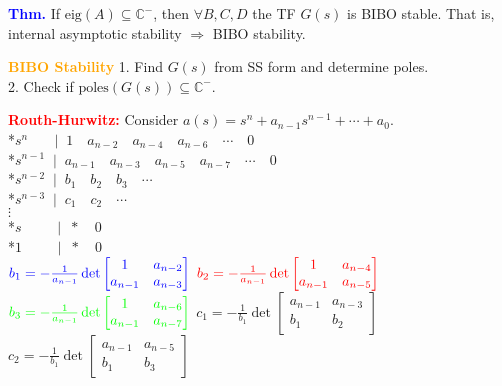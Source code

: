 \documentclass[5pt]{extarticle} %
\begin{document}
\begin{paracol}{3}
{    \textcolor{blue}{\textbf{Thm.}} If $\text{eig}(A) \subseteq \mathbb{C}^{-}$, then $\forall B, C, D$ the TF $G(s)$ is BIBO stable. That is, internal asymptotic stability $\Rightarrow$ BIBO stability.

    \textcolor{orange}{\textbf{BIBO Stability}} 1. Find $G(s)$ from SS form and determine poles. \\
    2. Check if $\text{poles}(G(s)) \subseteq \mathbb{C}^{-}$.
    
    \textcolor{red}{\textbf{Routh-Hurwitz:}} Consider $a(s) = s^n + a_{n-1} s^{n-1} + \cdots + a_0$. \\
    *$s^n \quad \; \, \, \mid \; 1 \quad a_{n-2} \quad a_{n-4} \quad a_{n-6} \quad \cdots \quad 0$ \\ 
    *$s^{n-1} \; \mid \; a_{n-1} \quad a_{n-3} \quad a_{n-5} \quad a_{n-7} \quad \cdots \quad 0$ \\
    *$s^{n-2} \; \mid \; b_1 \quad b_2 \quad b_3 \quad \cdots$ \\
    *$s^{n-3} \; \mid \; c_1 \quad c_2 \quad \cdots$ \\
    $\vdots$ \\
    *$s \quad \quad \; \mid \; * \quad 0$ \\
    *$1 \quad \quad \; \mid \; * \quad 0$ \\
    \(
    \textcolor{blue}{
    b_1 = -\frac{1}{a_{n-1}} \det 
    \begin{bmatrix} 
    1 & a_{n-2} \\ 
    a_{n-1} & a_{n-3} 
    \end{bmatrix}
    }
    \)
    \(
    \textcolor{red}{b_2 = -\frac{1}{a_{n-1}} \det 
    \begin{bmatrix} 
    1 & a_{n-4} \\ 
    a_{n-1} & a_{n-5} 
    \end{bmatrix}}
    \)
    \(
    \textcolor{green}{b_3 = -\frac{1}{a_{n-1}} \det 
    \begin{bmatrix} 
    1 & a_{n-6} \\ 
    a_{n-1} & a_{n-7} 
    \end{bmatrix}}
    \)
    \(
    c_1 = -\frac{1}{b_1} \det 
    \begin{bmatrix} 
    a_{n-1} & a_{n-3} \\ 
    b_1 & b_2 
    \end{bmatrix}
    \)
    \(
    c_2 = -\frac{1}{b_1} \det 
    \begin{bmatrix} 
    a_{n-1} & a_{n-5} \\ 
    b_1 & b_3 
    \end{bmatrix}
    \)

}
\end{paracol}
\end{document}
